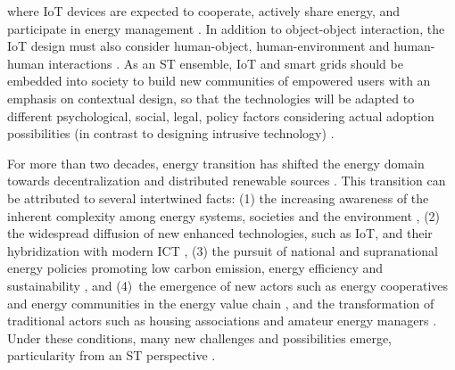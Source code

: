 %
% 
where IoT devices are expected to cooperate, actively share energy, and participate in energy management \cite{karnouskos2010cooperative}. 
% 
In addition to object-object interaction, the IoT design must also consider human-object, human-environment and human-human interactions \cite{guo2012opportunistic,guo2013opportunistic}. %
As an ST ensemble, IoT and smart grids should be embedded into society to build new communities of empowered users with an emphasis on contextual design, so that the technologies will be adapted to different psychological, social, legal, policy factors considering actual adoption possibilities (in contrast to designing intrusive technology)  \cite{ning2011future,Shin2014}.

For more than two decades, energy transition has shifted the energy domain
towards decentralization and distributed renewable sources \cite{rifkin_third_2011,sovacool_how_2016}. This transition can be attributed to several intertwined facts: 
(1) the increasing awareness of the inherent complexity among energy systems, societies 
and the environment \cite{bulkeley_bringing_2012,umbach_global_2010}, (2) the
widespread diffusion of new enhanced technologies, such as IoT, and their hybridization with modern ICT
\cite{putrus_smart_2013,schick_innovating_2013}, (3) the pursuit of national and 
supranational energy policies promoting low carbon emission, energy efficiency and sustainability
\cite{da_graca_carvalho_eu_2012}, and (4)~the emergence of new actors such as energy cooperatives and energy communities in the energy value chain \cite{viardot_role_2013}, and the 
transformation of traditional actors such as housing associations and amateur energy managers 
\cite{Hasselqvist2016}.
Under these conditions, many new challenges and possibilities emerge, particularity from an ST perspective  \cite{Shin2014}. 


